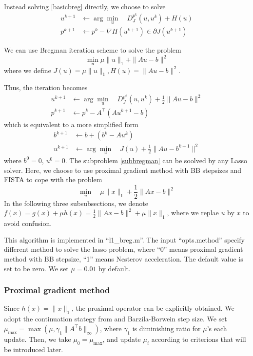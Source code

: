\documentclass[conference,onecolumn,12pt]{IEEEtran}
\newcommand{\<}{\langle}
\renewcommand{\>}{\rangle}
\numberwithin{equation}{section}
\begin{document}
Instead solving \ref{basicbreg} directly, we choose to solve
\begin{subequations}
    \begin{align}
        u^{k+1}&\gets \arg\min_u \quad D_J^{p^k}(u,u^k)+H(u)\\
        p^{k+1}&\gets p^k-\nabla H(u^{k+1})\in\partial J(u^{k+1})
    \end{align}
\end{subequations}

We can use Bregman iteration scheme to solve the problem
\begin{equation}
    \min_u \mu\|u\|_1+\|Au-b\|^2
\end{equation}
where we define $J(u)=\mu\|u\|_1, H(u)=\|Au-b\|^2$. 

Thus, the iteration becomes
\begin{subequations}
    \begin{align}
        u^{k+1}&\gets \arg\min_u \quad D_J^{p^k}(u,u^k)+\frac{1}{2}\|Au-b\|^2 \\
        p^{k+1}&\gets p^k-A^\top(Au^{k+1}-b)
    \end{align}
\end{subequations}
which is equivalent to a more simplified form
\begin{subequations}
\begin{align}
    b^{k+1}&\gets b +(b^k-Au^k)\\
    u^{k+1}&\gets \arg\min_u \quad J(u)+\frac{1}{2}\|Au-b^{k+1}\|^2\label{subbregman}
\end{align}
\end{subequations}
where $b^0=0$, $u^0=0$. The subproblem \ref{subbregman} can be soolved by any Lasso solver. Here, we choose to use proximal gradient method with BB stepsizes and FISTA to cope with the problem
\begin{equation}
    \min_u \quad \mu \|x\|_1+\frac{1}{2}\|Ax-b\|^2
\end{equation}
In the following three subsubsections, we denote $f(x)=g(x)+\mu h(x)=\frac{1}{2}\|Ax-b\|^2+\mu \|x\|_1$, where we replae $u$ by $x$ to avoid confusion. 

This algorithm is implemented in ``l1\_breg.m''. The input ``opts.method'' specify different method to solve the lasso problem, where ``0'' means proximal gradient method with BB stepsize, ``1'' means Nesterov acceleration. The default value is set to be zero. We set $\mu=0.01$ by default.
 
\subsubsection{Proximal gradient method}
Since $h(x)=\|x\|_1$, the proximal operator can be explicitly obtained. We adopt the continuation stategy from \cite{wen2010fast} and Barzila-Borwein step size. We set $\mu_{\max}=\max(\mu,\gamma_1 \|A^\top b\|_{\infty})$, where $\gamma_1$ is diminishing ratio for $\mu$'s each update. Then, we take $\mu_0=\mu_{\max}$, and update $\mu_i$ according to criterions that will be introduced later.
\end{document}
